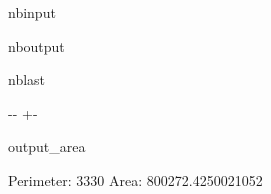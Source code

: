\documentclass[letterpaper,10pt,english]{sphinxmanual}
\begin{document}
\begin{sphinxuseclass}{nbinput}
{
\begin{sphinxVerbatim}[commandchars=\\\{\}]
\llap{\color{nbsphinxin}[26]:\,\hspace{\fboxrule}\hspace{\fboxsep}} 

  

  
  
   
\end{sphinxVerbatim}
}

\end{sphinxuseclass}
\begin{sphinxuseclass}{nboutput}
\begin{sphinxuseclass}{nblast}
{

\kern-\sphinxverbatimsmallskipamount\kern-\baselineskip
\kern+\FrameHeightAdjust\kern-\fboxrule
\vspace{\nbsphinxcodecellspacing}

\begin{sphinxuseclass}{output_area}
\begin{sphinxuseclass}{}


\begin{sphinxVerbatim}[commandchars=\\\{\}]
Perimeter:  3330  Area:  800272.4250021052
\end{sphinxVerbatim}



\end{sphinxuseclass}
\end{sphinxuseclass}
}

\end{sphinxuseclass}
\end{sphinxuseclass}
\end{document}
